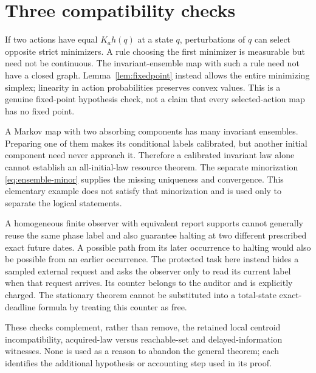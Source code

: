\section{Three compatibility checks}\label{sec:compatibility}
\begin{example}\label{ex:tie}
If two actions have equal $K_ah(q)$ at a state $q$, perturbations of $q$ can select opposite strict minimizers. A rule choosing the first minimizer is measurable but need not be continuous. The invariant-ensemble map with such a rule need not have a closed graph. Lemma~\ref{lem:fixedpoint} instead allows the entire minimizing simplex; linearity in action probabilities preserves convex values. This is a genuine fixed-point hypothesis check, not a claim that every selected-action map has no fixed point.
\end{example}

\begin{example}\label{ex:attraction}
A Markov map with two absorbing components has many invariant ensembles. Preparing one of them makes its conditional labels calibrated, but another initial component need never approach it. Therefore a calibrated invariant law alone cannot establish an all-initial-law resource theorem. The separate minorization \eqref{eq:ensemble-minor} supplies the missing uniqueness and convergence. This elementary example does not satisfy that minorization and is used only to separate the logical statements.
\end{example}

\begin{example}\label{ex:clock}
A homogeneous finite observer with equivalent report supports cannot generally reuse the same phase label and also guarantee halting at two different prescribed exact future dates. A possible path from its later occurrence to halting would also be possible from an earlier occurrence. The protected task here instead hides a sampled external request and asks the observer only to read its current label when that request arrives. Its counter belongs to the auditor and is explicitly charged. The stationary theorem cannot be substituted into a total-state exact-deadline formula by treating this counter as free.
\end{example}

These checks complement, rather than remove, the retained local centroid incompatibility, acquired-law versus reachable-set and delayed-information witnesses. None is used as a reason to abandon the general theorem; each identifies the additional hypothesis or accounting step used in its proof.
